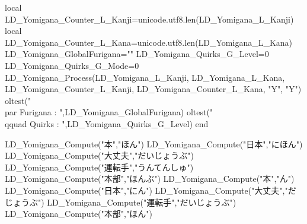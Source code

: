 {		%
		local LD_Yomigana_Counter_L_Kanji=unicode.utf8.len(LD_Yomigana_L_Kanji) 
		local LD_Yomigana_Counter_L_Kana=unicode.utf8.len(LD_Yomigana_L_Kana) 
		LD_Yomigana_GlobalFurigana="" %
		LD_Yomigana_Quirks_G_Level=0 %
		LD_Yomigana_Quirks_G_Mode=0 %
		LD_Yomigana_Process(LD_Yomigana_L_Kanji, LD_Yomigana_L_Kana, LD_Yomigana_Counter_L_Kanji, LD_Yomigana_Counter_L_Kana, "Y", "Y") 
	        oltest("\string\\par Furigana : ",LD_Yomigana_GlobalFurigana)
		 oltest("\string\\qquad Quirks : ",LD_Yomigana_Quirks_G_Level)
	end
	
	LD_Yomigana_Compute("本","ほん")
	LD_Yomigana_Compute("日本","にほん")
	LD_Yomigana_Compute("大丈夫","だいじょうぶ")
	LD_Yomigana_Compute("運転手","うんてんしゅ")
	LD_Yomigana_Compute("本部","ほんぶ")
	LD_Yomigana_Compute("本","ん")
	LD_Yomigana_Compute("日本","にん")
	LD_Yomigana_Compute("大丈夫","だじょうぶ")
	LD_Yomigana_Compute("運転手","だいじょうぶ")
	LD_Yomigana_Compute("本部","ほん")

}%
\bye
